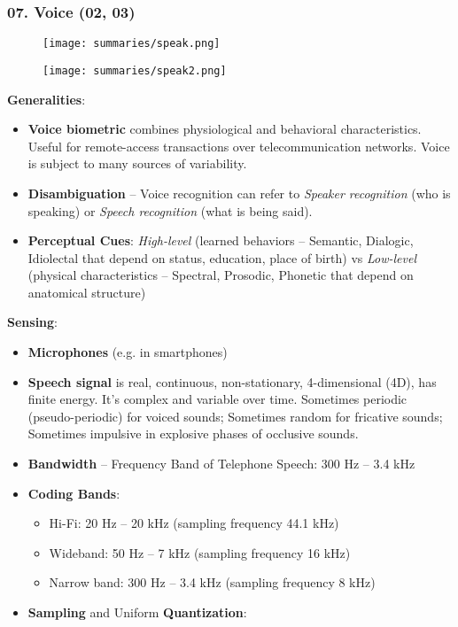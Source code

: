 \documentclass[a4paper]{article}
\begin{document}
    \subsubsection*{07. Voice (02, 03)}
      \begin{figure}[htp]
        \centering
          \texttt{[image: summaries/speak.png]}
      \end{figure}
      \begin{figure}[htp]
        \centering
          \texttt{[image: summaries/speak2.png]}
      \end{figure}
      \textbf{Generalities}:
      \begin{itemize}
        \item \textbf{Voice biometric} combines physiological and behavioral characteristics. Useful for remote-access transactions over telecommunication networks. Voice is subject to many sources of variability.
        \item \textbf{Disambiguation} -- Voice recognition can refer to \emph{Speaker recognition} (who is speaking) or \emph{Speech recognition} (what is being said).
        \item \textbf{Perceptual Cues}: \emph{High-level} (learned behaviors -- Semantic, Dialogic, Idiolectal that depend on status, education, place of birth) vs \emph{Low-level} (physical characteristics -- Spectral, Prosodic, Phonetic that depend on anatomical structure)
      \end{itemize}

      \textbf{Sensing}:
      \begin{itemize}
        \item \textbf{Microphones} (e.g. in smartphones)
        \item \textbf{Speech signal} is real, continuous, non-stationary, 4-dimensional (4D), has finite energy. It's complex and variable over time. Sometimes periodic (pseudo-periodic) for voiced sounds; Sometimes random for fricative sounds; Sometimes impulsive in explosive phases of occlusive sounds.
        \item \textbf{Bandwidth} -- Frequency Band of Telephone Speech: 300 Hz -- 3.4 kHz
        \item \textbf{Coding Bands}:
        \begin{itemize}
          \item Hi-Fi: 20 Hz -- 20 kHz (sampling frequency 44.1 kHz)
          \item Wideband: 50 Hz -- 7 kHz (sampling frequency 16 kHz)
          \item Narrow band: 300 Hz -- 3.4 kHz (sampling frequency 8 kHz)
        \end{itemize}
        \item \textbf{Sampling} and Uniform \textbf{Quantization}: \todo[inline]{}
      \end{itemize}
\end{document}
